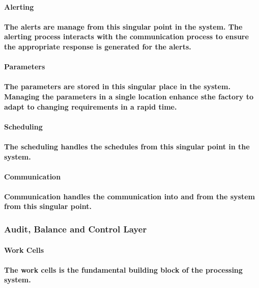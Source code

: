 \documentclass{acm_proc_article-sp}
\begin{document}
\paragraph{\textbf{Alerting}}
\paragraph{The alerts are manage from this singular point in the system. The alerting process interacts with the communication process to ensure the appropriate response is generated for the alerts.}
\paragraph{\textbf{Parameters}}
\paragraph{The parameters are stored in this singular place in the system. Managing the parameters in a single location enhance sthe factory to adapt to changing requirements in a rapid time.}
\paragraph{\textbf{Scheduling}}
\paragraph{The scheduling handles the schedules from this singular point in the system.}
\paragraph{\textbf{Communication}}
\paragraph{Communication handles the communication into and from the system from this singular point.}
\subsubsection{Audit, Balance and Control Layer}
\paragraph{\textbf{Work Cells}}
\paragraph{The work cells \cite{feld2000lean} is the fundamental building block of the processing system.}
\end{document}
